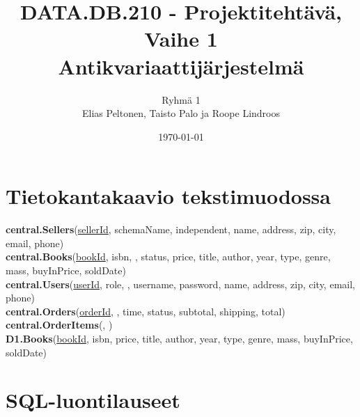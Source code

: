 \title{DATA.DB.210 - Projektitehtävä, Vaihe 1 \\ \large Antikvariaattijärjestelmä}
\author{Ryhmä 1 \\ \small Elias Peltonen, Taisto Palo ja Roope Lindroos}
\date{\today}

\newpage

\section*{Tietokantakaavio tekstimuodossa}

\noindent
\textbf{central.Sellers}(\underline{sellerId}, schemaName, independent, name, address, zip, city, email, phone) \\[0.5em]
\textbf{central.Books}(\underline{bookId}, isbn, , status, price, title, author, year, type, genre, mass, buyInPrice, soldDate) \\[0.5em]
\textbf{central.Users}(\underline{userId}, role, , username, password, name, address, zip, city, email, phone) \\[0.5em]
\textbf{central.Orders}(\underline{orderId}, , time, status, subtotal, shipping, total) \\[0.5em]
\textbf{central.OrderItems}(, ) \\[0.5em]
\textbf{D1.Books}(\underline{bookId}, isbn, price, title, author, year, type, genre, mass, buyInPrice, soldDate) \\[0.5em]

\section*{SQL-luontilauseet}
\inputminted{sql}{create.sql}